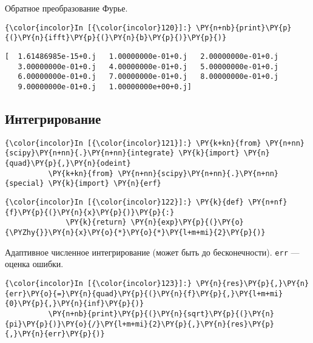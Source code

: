     Обратное преобразование Фурье.

    \begin{Verbatim}[commandchars=\\\{\}]
{\color{incolor}In [{\color{incolor}120}]:} \PY{n+nb}{print}\PY{p}{(}\PY{n}{ifft}\PY{p}{(}\PY{n}{b}\PY{p}{)}\PY{p}{)}
\end{Verbatim}

    \begin{Verbatim}[commandchars=\\\{\}]
[  1.61486985e-15+0.j   1.00000000e-01+0.j   2.00000000e-01+0.j
   3.00000000e-01+0.j   4.00000000e-01+0.j   5.00000000e-01+0.j
   6.00000000e-01+0.j   7.00000000e-01+0.j   8.00000000e-01+0.j
   9.00000000e-01+0.j   1.00000000e+00+0.j]

    \end{Verbatim}

\subsection{Интегрирование}
\label{numpy6}

    \begin{Verbatim}[commandchars=\\\{\}]
{\color{incolor}In [{\color{incolor}121}]:} \PY{k+kn}{from} \PY{n+nn}{scipy}\PY{n+nn}{.}\PY{n+nn}{integrate} \PY{k}{import} \PY{n}{quad}\PY{p}{,}\PY{n}{odeint}
          \PY{k+kn}{from} \PY{n+nn}{scipy}\PY{n+nn}{.}\PY{n+nn}{special} \PY{k}{import} \PY{n}{erf}
\end{Verbatim}

    \begin{Verbatim}[commandchars=\\\{\}]
{\color{incolor}In [{\color{incolor}122}]:} \PY{k}{def} \PY{n+nf}{f}\PY{p}{(}\PY{n}{x}\PY{p}{)}\PY{p}{:}
              \PY{k}{return} \PY{n}{exp}\PY{p}{(}\PY{o}{\PYZhy{}}\PY{n}{x}\PY{o}{*}\PY{o}{*}\PY{l+m+mi}{2}\PY{p}{)}
\end{Verbatim}

    Адаптивное численное интегрирование (может быть до бесконечности).
\texttt{err} --- оценка ошибки.

    \begin{Verbatim}[commandchars=\\\{\}]
{\color{incolor}In [{\color{incolor}123}]:} \PY{n}{res}\PY{p}{,}\PY{n}{err}\PY{o}{=}\PY{n}{quad}\PY{p}{(}\PY{n}{f}\PY{p}{,}\PY{l+m+mi}{0}\PY{p}{,}\PY{n}{inf}\PY{p}{)}
          \PY{n+nb}{print}\PY{p}{(}\PY{n}{sqrt}\PY{p}{(}\PY{n}{pi}\PY{p}{)}\PY{o}{/}\PY{l+m+mi}{2}\PY{p}{,}\PY{n}{res}\PY{p}{,}\PY{n}{err}\PY{p}{)}
\end{Verbatim}

